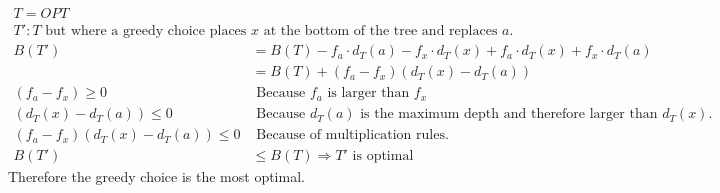 \begin{align*}
  T=OPT\\
  T':T \textrm{ but where a greedy choice places $x$ at the bottom of the tree
  and replaces $a$.}
\end{align*}
\begin{align*}
  B(T')&=B(T)-f_a\cdot d_T(a)-f_x\cdot d_T(x)
  +f_a\cdot d_T(x)+f_x\cdot d_T(a)\\
  &=B(T)+(f_a-f_x)(d_T(x)-d_T(a))\\
  (f_a-f_x)\geq0&\textrm{ Because $f_a$ is larger than $f_x$}\\
  (d_T(x)-d_T(a))\leq0&\textrm{ Because $d_T(a)$ is the maximum depth and
  therefore larger than $d_T(x)$.}\\
  (f_a-f_x)(d_T(x)-d_T(a))\leq0&\textrm{ Because of multiplication rules.}\\
  B(T')&\leq B(T) \Rightarrow T'\textrm{ is optimal}
\end{align*}
Therefore the greedy choice is the most optimal.
